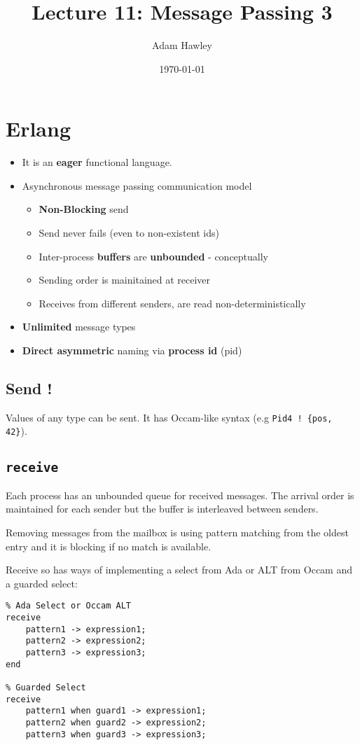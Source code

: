 \documentclass[11pt]{article}
\author{Adam Hawley}
\date{\today}
\title{Lecture 11: Message Passing 3}
\begin{document}
\maketitle
\tableofcontents


\section{Erlang}
\label{sec:org9d62641}
\begin{itemize}
\item It is an \textbf{eager} functional language.
\item Asynchronous message passing communication model
\begin{itemize}
\item \textbf{Non-Blocking} send
\item Send never fails (even to non-existent ids)
\item Inter-process \textbf{buffers} are \textbf{unbounded} - conceptually
\item Sending order is mainitained at receiver
\item Receives from different senders, are read non-deterministically
\end{itemize}
\item \textbf{Unlimited} message types
\item \textbf{Direct asymmetric} naming via \textbf{process id} (pid)
\end{itemize}

\subsection{Send !}
\label{sec:org0d31047}
Values of any type can be sent.
It has Occam-like syntax (e.g \texttt{Pid4 ! \{pos, 42\}}).

\subsection{\texttt{receive}}
\label{sec:org5114c17}
Each process has an unbounded queue for received messages.
The arrival order is maintained for each sender but the buffer is interleaved between senders.

Removing messages from the mailbox is using pattern matching from the oldest entry and it is blocking if no match is available.

Receive so has ways of implementing a select from Ada or ALT from Occam and a guarded select:
\begin{verbatim}
% Ada Select or Occam ALT
receive
    pattern1 -> expression1;
    pattern2 -> expression2;
    pattern3 -> expression3;
end

% Guarded Select
receive
    pattern1 when guard1 -> expression1;
    pattern2 when guard2 -> expression2;
    pattern3 when guard3 -> expression3;
\end{verbatim}
\end{document}
